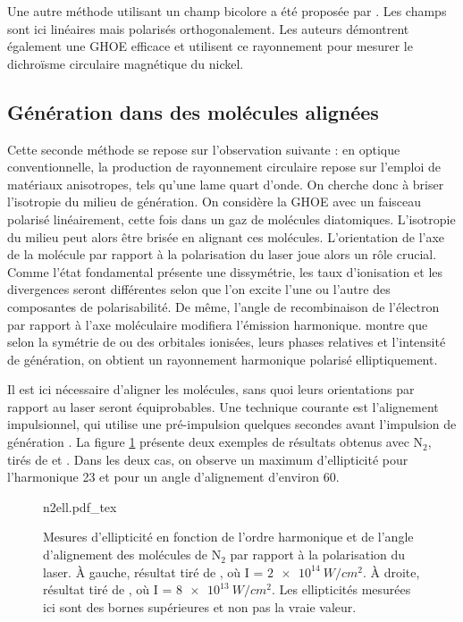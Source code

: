 Une autre méthode utilisant un champ bicolore a été proposée par . Les champs sont ici linéaires mais polarisés orthogonalement. Les auteurs démontrent également une GHOE efficace et utilisent ce rayonnement pour mesurer le dichroïsme circulaire magnétique du nickel.


\subsection{Génération dans des molécules alignées}
Cette seconde méthode se repose sur l'observation suivante : en optique conventionnelle, la production de rayonnement circulaire repose sur l'emploi de matériaux anisotropes, tels qu'une lame quart d'onde. On cherche donc à briser l'isotropie du milieu de génération. On considère la GHOE avec un faisceau polarisé linéairement, cette fois dans un gaz de molécules diatomiques. L'isotropie du milieu peut alors être brisée en alignant ces molécules. L'orientation de l'axe de la molécule par rapport à la polarisation du laser joue alors un rôle crucial. Comme l'état fondamental présente une dissymétrie, les taux d'ionisation et les divergences seront différentes selon que l'on excite l'une ou l'autre des composantes de polarisabilité. De même, l'angle de recombinaison de l'électron par rapport à l'axe moléculaire modifiera l'émission harmonique.  montre que selon la symétrie de ou des orbitales ionisées, leurs phases relatives et l'intensité de génération, on obtient un rayonnement harmonique polarisé elliptiquement. \par
Il est ici nécessaire d'aligner les molécules, sans quoi leurs orientations par rapport au laser seront équiprobables. Une technique courante est l'alignement impulsionnel, qui utilise une pré-impulsion quelques secondes avant l'impulsion de génération . La figure \ref{fig:n2ell} présente deux exemples de résultats obtenus avec $\text{N}_\text{2}$, tirés de  et . Dans les deux cas, on observe un maximum d'ellipticité pour l'harmonique 23 et pour un angle d'alignement d'environ 60\degres.

\begin{figure}[!ht]
\centering
\def\svgwidth{1\columnwidth}
{n2ell.pdf_tex}
\caption{Mesures d'ellipticité en fonction de l'ordre harmonique et de l'angle d'alignement des molécules de $\text{N}_\text{2}$ par rapport à la polarisation du laser. \`{A} gauche, résultat tiré de , où I = $\SI{2e14}{W/cm^2}$. \`{A} droite, résultat tiré de , où I = $\SI{8e13}{W/cm^2}$. Les ellipticités mesurées ici sont des bornes supérieures et non pas la vraie valeur.}
\label{fig:n2ell}
\end{figure}

